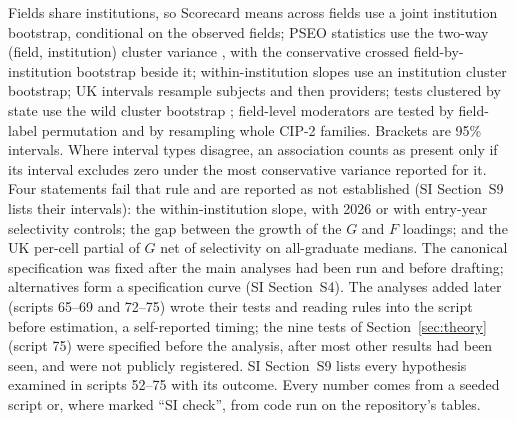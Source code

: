 \documentclass[11pt]{article}
\newcommand{\SI}[1]{SI Section~S#1}
\begin{document}
Fields share institutions, so Scorecard means across fields use a joint institution bootstrap, conditional on
the observed fields; PSEO statistics use the two-way (field,
institution) cluster variance \citep{cameron2011robust}, with the conservative crossed field-by-institution
bootstrap beside it; within-institution slopes use an institution cluster bootstrap; UK intervals resample
subjects and then providers; tests clustered by state use the wild cluster bootstrap \citep{cameron2008bootstrap,
webb2023reworking}; field-level moderators are tested by field-label permutation and by resampling whole CIP-2
families. Brackets are 95\% intervals. Where interval types disagree, an association counts as present only if its
interval excludes zero under the most conservative variance reported for it. Four statements fail that rule and
are reported as not established (\SI{9} lists their intervals): the within-institution slope, with 2026 or with
entry-year selectivity controls; the gap between the growth of the $G$ and $F$ loadings; and the UK per-cell
partial of $G$ net of selectivity on all-graduate medians. The canonical specification was fixed after the main
analyses had been run and before drafting; alternatives form a specification curve
\citep{simonsohn2020specification} (\SI{4}). The analyses added later (scripts 65--69 and 72--75) wrote their tests and reading rules into the script before
estimation, a self-reported timing; the nine tests of Section~\ref{sec:theory} (script 75) were specified before the analysis, after most other
results had been seen, and were not publicly registered. \SI{9} lists every hypothesis examined in scripts
52--75 with its outcome. Every number comes from a seeded script or, where marked ``SI check'', from code run on the
repository's tables.
\end{document}
